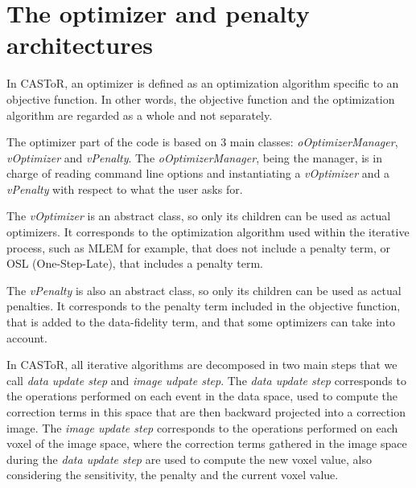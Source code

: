 \documentclass[a4paper, 11pt]{article}
\begin{document}
\section{The optimizer and penalty architectures}

In CASToR, an optimizer is defined as an optimization algorithm specific to an objective function.
In other words, the objective function and the optimization algorithm are regarded as a whole and not separately.

The optimizer part of the code is based on 3 main classes: \textit{oOptimizerManager}, \textit{vOptimizer} and \textit{vPenalty}.
The \textit{oOptimizerManager}, being the manager, is in charge of reading command line options and instantiating a \textit{vOptimizer} and a \textit{vPenalty} with respect to what the user asks for.

The \textit{vOptimizer} is an abstract class, so only its children can be used as actual optimizers.
It corresponds to the optimization algorithm used within the iterative process, such as MLEM for example, that does not include a penalty term, or OSL (One-Step-Late), that includes a penalty term.

The \textit{vPenalty} is also an abstract class, so only its children can be used as actual penalties.
It corresponds to the penalty term included in the objective function, that is added to the data-fidelity term, and that some optimizers can take into account.

In CASToR, all iterative algorithms are decomposed in two main steps that we call \textit{data update step} and \textit{image udpate step}.
The \textit{data update step} corresponds to the operations performed on each event in the data space, used to compute the correction terms in this space that are then backward projected into a correction image.
The \textit{image update step} corresponds to the operations performed on each voxel of the image space, where the correction terms gathered in the image space during the \textit{data update step} are used to compute the new voxel value, also considering the sensitivity, the penalty and the current voxel value.

\bigskip
\end{document}
